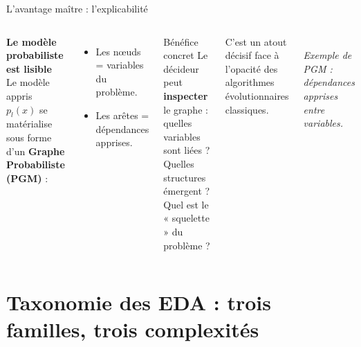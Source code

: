 \documentclass[10pt,aspectratio=169]{beamer}
\begin{document}
\begin{frame}{L'avantage maître : l'explicabilité}
\begin{columns}[T]
\textbf{Le modèle probabiliste est lisible}\\[0.2cm]
Le modèle appris $p_l(x)$ se matérialise sous forme d'un \textbf{Graphe Probabiliste (PGM)} :
\begin{itemize}
  \item Les \textcolor{primaryblue}{nœuds} = variables du problème.
  \item Les \textcolor{accentorange}{arêtes} = dépendances apprises.
\end{itemize}

\vspace{0.3cm}
\begin{exampleblock}{Bénéfice concret}
Le décideur peut \textbf{inspecter} le graphe : quelles variables sont liées ? Quelles structures émergent ? Quel est le « squelette » du problème ?
\end{exampleblock}

C'est un atout décisif face à l'opacité des algorithmes évolutionnaires classiques.

\centering
{}\\[0.2cm]
\footnotesize\textit{Exemple de PGM : dépendances apprises entre variables.}
\end{columns}
\end{frame}

\section{Taxonomie des EDA : trois familles, trois complexités}
\end{document}
